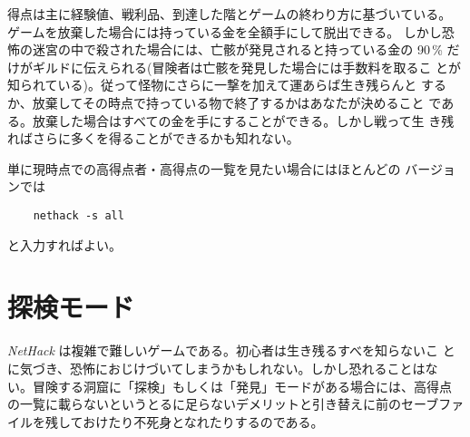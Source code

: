 得点は主に経験値、戦利品、到達した階とゲームの終わり方に基づいている。
ゲームを放棄した場合には持っている金を全額手にして脱出できる。
しかし恐怖の迷宮の中で殺された場合には、亡骸が発見されると持っている金の 90\,\%
だけがギルドに伝えられる(冒険者は亡骸を発見した場合には手数料を取るこ
とが知られている)。従って怪物にさらに一撃を加えて運あらば生き残らんと
するか、放棄してその時点で持っている物で終了するかはあなたが決めること
である。放棄した場合はすべての金を手にすることができる。しかし戦って生
き残ればさらに多くを得ることができるかも知れない。

単に現時点での高得点者・高得点の一覧を見たい場合にはほとんどの
バージョンでは
\begin{verbatim}
    nethack -s all
\end{verbatim}
と入力すればよい。

\section{探検モード}

{\it NetHack\/} は複雑で難しいゲームである。初心者は生き残るすべを知らないこ
とに気づき、恐怖におじけづいてしまうかもしれない。しかし恐れることはな
い。冒険する洞窟に「探検」もしくは「発見」モードがある場合には、高得点
の一覧に載らないというとるに足らないデメリットと引き替えに前のセーブファ
イルを残しておけたり不死身となれたりするのである。

